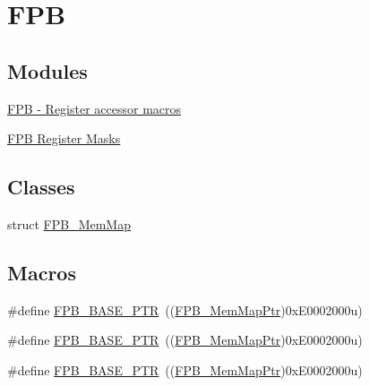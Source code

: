 \hypertarget{group___f_p_b___peripheral}{}\section{F\+PB}
\label{group___f_p_b___peripheral}
\subsection*{Modules}
\begin{DoxyCompactItemize}
\item 
\hyperlink{group___f_p_b___register___accessor___macros}{F\+P\+B -\/ Register accessor macros}
\item 
\hyperlink{group___f_p_b___register___masks}{F\+P\+B Register Masks}
\end{DoxyCompactItemize}
\subsection*{Classes}
\begin{DoxyCompactItemize}
\item 
struct \hyperlink{struct_f_p_b___mem_map}{F\+P\+B\+\_\+\+Mem\+Map}
\end{DoxyCompactItemize}
\subsection*{Macros}
\begin{DoxyCompactItemize}
\item 
\#define \hyperlink{group___f_p_b___peripheral_ga95d994c97f967ce02339465def6bac95}{F\+P\+B\+\_\+\+B\+A\+S\+E\+\_\+\+P\+TR}~((\hyperlink{group___f_p_b___peripheral_gaffb8b5a06bae98ff71e1337bfd371172}{F\+P\+B\+\_\+\+Mem\+Map\+Ptr})0x\+E0002000u)
\item 
\#define \hyperlink{group___f_p_b___peripheral_ga95d994c97f967ce02339465def6bac95}{F\+P\+B\+\_\+\+B\+A\+S\+E\+\_\+\+P\+TR}~((\hyperlink{group___f_p_b___peripheral_gaffb8b5a06bae98ff71e1337bfd371172}{F\+P\+B\+\_\+\+Mem\+Map\+Ptr})0x\+E0002000u)
\item 
\#define \hyperlink{group___f_p_b___peripheral_ga95d994c97f967ce02339465def6bac95}{F\+P\+B\+\_\+\+B\+A\+S\+E\+\_\+\+P\+TR}~((\hyperlink{group___f_p_b___peripheral_gaffb8b5a06bae98ff71e1337bfd371172}{F\+P\+B\+\_\+\+Mem\+Map\+Ptr})0x\+E0002000u)
\end{DoxyCompactItemize}
